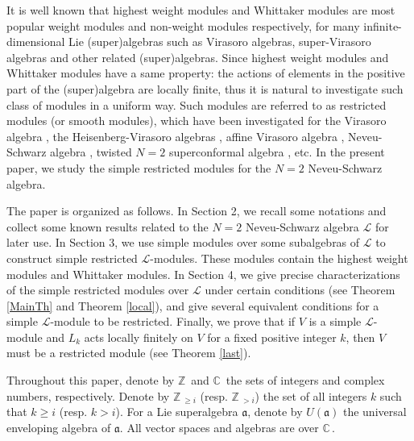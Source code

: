 \documentclass[12pt]{article}
\def\ssc{\scriptscriptstyle}
\def\Z{\mathbb{Z}{\ssc\,}}
\def\C{\mathbb{C}{\ssc\,}}
\numberwithin{equation}{section}
\begin{document}
It is well known that highest weight modules and Whittaker modules are most popular
weight modules and non-weight modules respectively, for many infinite-dimensional Lie (super)algebras such as Virasoro algebras, super-Virasoro algebras and other related (super)algebras.
Since highest weight modules and Whittaker modules have a same property: the actions of elements in the positive part of the (super)algebra are locally finite, thus it is natural to
investigate such class of modules in a uniform way.  Such modules are referred to as restricted modules (or smooth modules), which have been investigated for the Virasoro algebra \cite{MZ2,MNTZ},
 the Heisenberg-Virasoro algebras
 \cite{CG, G, GXZ}, affine Virasoro algebra \cite{GXZ, MNTZ}, Neveu-Schwarz algebra \cite{LPX20}, twisted $N=2$ superconformal algebra \cite{CSX}, etc.
In the present paper, we study the simple restricted modules for the $N=2$ Neveu-Schwarz algebra.

The paper is organized as follows. In Section 2, we recall some notations and collect
some known results related to the $N=2$ Neveu-Schwarz algebra $\mathcal{L}$ for later use. In Section
3, we use simple modules over some subalgebras of $\mathcal{L}$ to construct simple restricted $\mathcal{L}$-modules. These modules contain the highest weight modules and Whittaker modules. In Section 4, we give  precise characterizations
of the simple restricted modules over $\mathcal{L}$ under certain conditions (see Theorem \ref{MainTh} and Theorem \ref{local}), and  give several equivalent conditions for a simple $\mathcal{L}$-module to be  restricted.  Finally, we  prove that if $V$ is a simple $\mathcal{L}$-module and $L_k$ acts locally finitely on  $V$ for a fixed positive integer $k$, then $V$  must be  a restricted module  (see Theorem \ref{last}).





Throughout this paper, denote by $\Z$ and $\C$ the sets of integers and complex numbers, respectively. Denote by $\Z_{\ge i}$ (resp. $\Z_{>i}$) the set of all integers $k$ such that $k\ge i$ (resp. $k>i$). For a Lie superalgebra $\mathfrak{a}$, denote by $U(\mathfrak{a})$  the universal enveloping algebra of $\mathfrak{a}$. All vector spaces and algebras are over $\C$.
\end{document}
